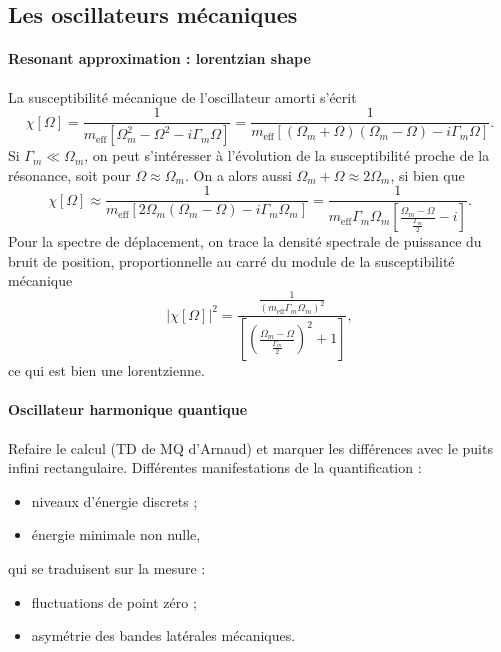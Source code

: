 \documentclass[12pt,a4paper]{article}
\begin{document}
\subsection{Les oscillateurs mécaniques}
\label{sec:mechanical_oscillators}

\paragraph{Resonant approximation : lorentzian shape\\}
La susceptibilité mécanique de l'oscillateur amorti s'écrit
\begin{equation}
\chi[\Omega] = \frac{1}{m_\mathrm{eff}\left[\Omega_m^2-\Omega^2 - i\Gamma_m\Omega\right]} = \frac{1}{m_\mathrm{eff}\left[(\Omega_m+\Omega)(\Omega_m-\Omega) - i\Gamma_m\Omega\right]}.
\end{equation}
Si $\Gamma_m \ll \Omega_m$, on peut s'intéresser à l'évolution de la susceptibilité proche de la résonance, soit pour $\Omega \approx \Omega_m$.
On a alors aussi $\Omega_m+\Omega \approx 2\Omega_m$, si bien que
\begin{equation}
\chi[\Omega] \approx \frac{1}{m_\mathrm{eff}\left[2\Omega_m(\Omega_m-\Omega) - i\Gamma_m\Omega_m\right]} = \frac{1}{m_\mathrm{eff}\Gamma_m\Omega_m\left[\frac{\Omega_m-\Omega}{\frac{\Gamma_m}{2}} - i\right]}.
\end{equation}
Pour la spectre de déplacement, on trace la densité spectrale de puissance du bruit de position, proportionnelle au carré du module de la susceptibilité mécanique
\begin{equation}
\left|\chi[\Omega]\right|^2 = \frac{\frac{1}{(m_\mathrm{eff}\Gamma_m\Omega_m)^2}}{\left[\left(\frac{\Omega_m-\Omega}{\frac{\Gamma_m}{2}}\right)^2 + 1\right]},
\end{equation}
ce qui est bien une lorentzienne.

\paragraph{Oscillateur harmonique quantique\\}
Refaire le calcul (TD de MQ d'Arnaud) et marquer les différences avec le puits infini rectangulaire.
Différentes manifestations de la quantification :
\begin{itemize}
\item niveaux d'énergie discrets ;
\item énergie minimale non nulle,
\end{itemize}
qui se traduisent sur la mesure :
\begin{itemize}
\item fluctuations de point zéro ;
\item asymétrie des bandes latérales mécaniques.
\end{itemize}
\end{document}
